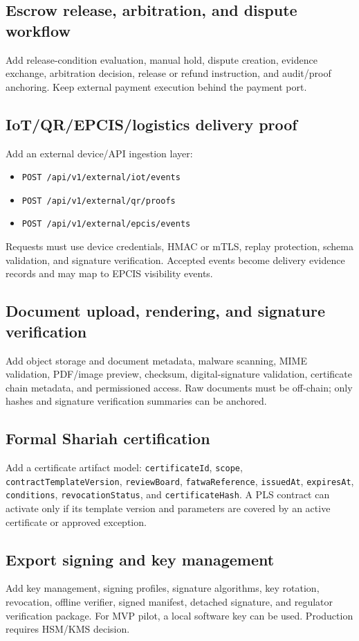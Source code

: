 \documentclass[11pt]{article}
\newcommand{\code}[1]{\texttt{#1}}
\begin{document}
\subsection{Escrow release, arbitration, and dispute workflow}
Add release-condition evaluation, manual hold, dispute creation, evidence exchange, arbitration decision, release or refund instruction, and audit/proof anchoring. Keep external payment execution behind the payment port.

\subsection{IoT/QR/EPCIS/logistics delivery proof}
Add an external device/API ingestion layer:
\begin{itemize}
  \item \code{POST /api/v1/external/iot/events}
  \item \code{POST /api/v1/external/qr/proofs}
  \item \code{POST /api/v1/external/epcis/events}
\end{itemize}
Requests must use device credentials, HMAC or mTLS, replay protection, schema validation, and signature verification. Accepted events become delivery evidence records and may map to EPCIS visibility events.

\subsection{Document upload, rendering, and signature verification}
Add object storage and document metadata, malware scanning, MIME validation, PDF/image preview, checksum, digital-signature validation, certificate chain metadata, and permissioned access. Raw documents must be off-chain; only hashes and signature verification summaries can be anchored.

\subsection{Formal Shariah certification}
Add a certificate artifact model: \code{certificateId}, \code{scope}, \code{contractTemplateVersion}, \code{reviewBoard}, \code{fatwaReference}, \code{issuedAt}, \code{expiresAt}, \code{conditions}, \code{revocationStatus}, and \code{certificateHash}. A PLS contract can activate only if its template version and parameters are covered by an active certificate or approved exception.

\subsection{Export signing and key management}
Add key management, signing profiles, signature algorithms, key rotation, revocation, offline verifier, signed manifest, detached signature, and regulator verification package. For MVP pilot, a local software key can be used. Production requires HSM/KMS decision.
\end{document}
